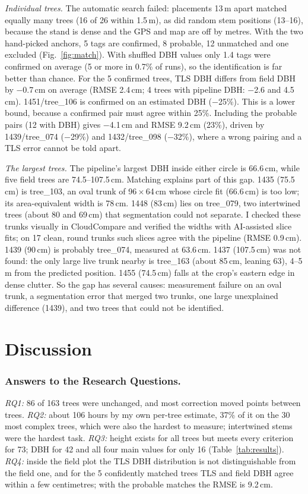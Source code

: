 \documentclass[runningheads]{llncs}
\begin{document}
\emph{Individual trees.} The automatic search failed: placements 13\,m apart matched equally many trees (16 of 26 within 1.5\,m), as did random stem positions (13--16), because the stand is dense and the GPS and map are off by metres. With the two hand-picked anchors, 5 tags are confirmed, 8 probable, 12 unmatched and one excluded (Fig.~\ref{fig:match}). With shuffled DBH values only 1.4 tags were confirmed on average (5 or more in 0.7\% of runs), so the identification is far better than chance. For the 5 confirmed trees, TLS DBH differs from field DBH by $-$0.7\,cm on average (RMSE 2.4\,cm; 4 trees with pipeline DBH: $-$2.6 and 4.5\,cm). 1451/tree\_106 is confirmed on an estimated DBH ($-$25\%). This is a lower bound, because a confirmed pair must agree within 25\%. Including the probable pairs (12 with DBH) gives $-$4.1\,cm and RMSE 9.2\,cm (23\%), driven by 1439/tree\_074 ($-$29\%) and 1432/tree\_098 ($-$32\%), where a wrong pairing and a TLS error cannot be told apart.

\emph{The largest trees.} The pipeline's largest DBH inside either circle is 66.6\,cm, while five field trees are 74.5--107.5\,cm. Matching explains part of this gap. 1435 (75.5\,cm) is tree\_103, an oval trunk of 96\,$\times$\,64\,cm whose circle fit (66.6\,cm) is too low; its area-equivalent width is 78\,cm. 1448 (83\,cm) lies on tree\_079, two intertwined trees (about 80 and 69\,cm) that segmentation could not separate. I checked these trunks visually in CloudCompare and verified the widths with AI-assisted slice fits; on 17 clean, round trunks such slices agree with the pipeline (RMSE 0.9\,cm). 1439 (90\,cm) is probably tree\_074, measured at 63.6\,cm. 1437 (107.5\,cm) was not found: the only large live trunk nearby is tree\_163 (about 85\,cm, leaning 63\textdegree), 4--5\,m from the predicted position. 1455 (74.5\,cm) falls at the crop's eastern edge in dense clutter. So the gap has several causes: measurement failure on an oval trunk, a segmentation error that merged two trunks, one large unexplained difference (1439), and two trees that could not be identified.%
\section{Discussion}\label{sec:discussion}

\subsubsection{Answers to the Research Questions.}
\emph{RQ1:} 86 of 163 trees were unchanged, and most correction moved points between trees. \emph{RQ2:} about 106 hours by my own per-tree estimate, 37\% of it on the 30 most complex trees, which were also the hardest to measure; intertwined stems were the hardest task. \emph{RQ3:} height exists for all trees but meets every criterion for 73; DBH for 42 and all four main values for only 16 (Table~\ref{tab:results}). \emph{RQ4:} inside the field plot the TLS DBH distribution is not distinguishable from the field one, and for the 5 confidently matched trees TLS and field DBH agree within a few centimetres; with the probable matches the RMSE is 9.2\,cm.
\end{document}
